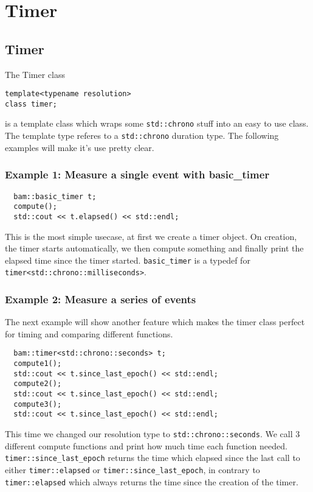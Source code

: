 \documentclass[11pt, a4paper]{article}
\begin{document}
\section{Timer}
\subsection{Timer}

The Timer class 
\begin{lstlisting}
template<typename resolution>
class timer;
\end{lstlisting}

 is a template class which wraps some \texttt{std::chrono} stuff into an easy to use class. The template type referes to a \texttt{std::chrono} duration type. The following examples  will make it's use pretty clear.
\subsubsection{Example 1: Measure a single event with basic\_timer}
\begin{lstlisting}
  bam::basic_timer t;
  compute();
  std::cout << t.elapsed() << std::endl;
\end{lstlisting}

This is the most simple usecase, at first we create a timer object. On creation, the timer starts automatically, we then compute something and finally print the elapsed time since the timer started. \texttt{basic\_timer} is a typedef for \texttt{timer<std::chrono::milliseconds>}.
\subsubsection{Example 2: Measure a series of events}
The next example will show another feature which makes the timer class perfect for timing and comparing different functions.

\begin{lstlisting}
  bam::timer<std::chrono::seconds> t;
  compute1();
  std::cout << t.since_last_epoch() << std::endl;
  compute2();
  std::cout << t.since_last_epoch() << std::endl;
  compute3();
  std::cout << t.since_last_epoch() << std::endl;
\end{lstlisting}

This time we changed our resolution type to \texttt{std::chrono::seconds}. We call 3 different compute functions and print how much time each function needed. \texttt{timer::since\_last\_epoch} returns the time which elapsed since the last call to either \texttt{timer::elapsed} or \texttt{timer::since\_last\_epoch}, in contrary to \texttt{timer::elapsed} which always returns the time since the creation of the timer.
\end{document}
